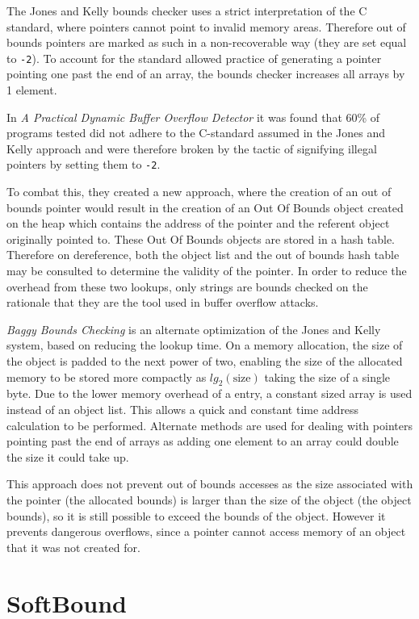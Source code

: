 The Jones and Kelly bounds checker uses a strict interpretation of the C standard, where pointers cannot point to invalid memory areas.
Therefore out of bounds pointers are marked as such in a non-recoverable way (they are set equal to \verb!-2!).
To account for the standard allowed practice of generating a pointer pointing one past the end of an array, the bounds checker increases all arrays by 1 element.

In \textit{A Practical Dynamic Buffer Overflow Detector} \cite{ruwase2004practical} it was found that 60\% of programs tested did not adhere to the C-standard assumed in the Jones and Kelly approach and were therefore broken by the tactic of signifying illegal pointers by setting them to \verb!-2!.

To combat this, they created a new approach, where the creation of an out of bounds pointer would result in the creation of an Out Of Bounds object created on the heap which contains the address of the pointer and the referent object originally pointed to.
These Out Of Bounds objects are stored in a hash table.
Therefore on dereference, both the object list and the out of bounds hash table may be consulted to determine the validity of the pointer.
In order to reduce the overhead from these two lookups, only strings are bounds checked on the rationale that they are the tool used in buffer overflow attacks.

\textit{Baggy Bounds Checking} \cite{akritidis2009baggy} is an alternate optimization of the Jones and Kelly system, based on reducing the lookup time.
On a memory allocation, the size of the object is padded to the next power of two, enabling the size of the allocated memory to be stored more compactly as $lg_2(\mbox{size})$ taking the size of a single byte.
Due to the lower memory overhead of a entry, a constant sized array is used instead of an object list.
This allows a quick and constant time address calculation to be performed.
Alternate methods are used for dealing with pointers pointing past the end of arrays as adding one element to an array could double the size it could take up.

This approach does not prevent out of bounds accesses as the size associated with the pointer (the allocated bounds) is larger than the size of the object (the object bounds), so it is still possible to exceed the bounds of the object.
However it prevents dangerous overflows, since a pointer cannot access memory of an object that it was not created for.

\section{SoftBound}

